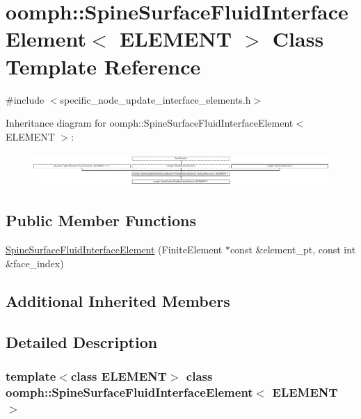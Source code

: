 \hypertarget{classoomph_1_1SpineSurfaceFluidInterfaceElement}{}\section{oomph\+:\+:Spine\+Surface\+Fluid\+Interface\+Element$<$ E\+L\+E\+M\+E\+NT $>$ Class Template Reference}
\label{classoomph_1_1SpineSurfaceFluidInterfaceElement}


{\ttfamily \#include $<$specific\+\_\+node\+\_\+update\+\_\+interface\+\_\+elements.\+h$>$}

Inheritance diagram for oomph\+:\+:Spine\+Surface\+Fluid\+Interface\+Element$<$ E\+L\+E\+M\+E\+NT $>$\+:\begin{figure}[H]
\begin{center}
\leavevmode
\includegraphics[height=1.272004cm]{classoomph_1_1SpineSurfaceFluidInterfaceElement}
\end{center}
\end{figure}
\subsection*{Public Member Functions}
\begin{DoxyCompactItemize}
\item 
\hyperlink{classoomph_1_1SpineSurfaceFluidInterfaceElement_aa1d52a09e4f50085b957463a0da22d4a}{Spine\+Surface\+Fluid\+Interface\+Element} (Finite\+Element $\ast$const \&element\+\_\+pt, const int \&face\+\_\+index)
\end{DoxyCompactItemize}
\subsection*{Additional Inherited Members}


\subsection{Detailed Description}
\subsubsection*{template$<$class E\+L\+E\+M\+E\+NT$>$\newline
class oomph\+::\+Spine\+Surface\+Fluid\+Interface\+Element$<$ E\+L\+E\+M\+E\+N\+T $>$}



